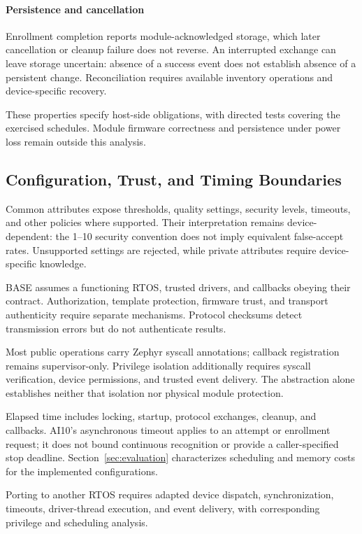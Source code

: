 \paragraph{Persistence and cancellation}
Enrollment completion reports module-acknowledged storage, which later cancellation or cleanup failure does not reverse. An interrupted exchange can leave storage uncertain: absence of a success event does not establish absence of a persistent change. Reconciliation requires available inventory operations and device-specific recovery.

These properties specify host-side obligations, with directed tests covering the exercised schedules. Module firmware correctness and persistence under power loss remain outside this analysis.

\subsection{Configuration, Trust, and Timing Boundaries}
\label{sec:threat_model}

Common attributes expose thresholds, quality settings, security levels, timeouts, and other policies where supported. Their interpretation remains device-dependent: the 1--10 security convention does not imply equivalent false-accept rates. Unsupported settings are rejected, while private attributes require device-specific knowledge.

BASE assumes a functioning RTOS, trusted drivers, and callbacks obeying their contract. Authorization, template protection, firmware trust, and transport authenticity require separate mechanisms. Protocol checksums detect transmission errors but do not authenticate results.

Most public operations carry Zephyr syscall annotations; callback registration remains supervisor-only. Privilege isolation additionally requires syscall verification, device permissions, and trusted event delivery. The abstraction alone establishes neither that isolation nor physical module protection.

Elapsed time includes locking, startup, protocol exchanges, cleanup, and callbacks. AI10's asynchronous timeout applies to an attempt or enrollment request; it does not bound continuous recognition or provide a caller-specified stop deadline. Section~\ref{sec:evaluation} characterizes scheduling and memory costs for the implemented configurations.

Porting to another RTOS requires adapted device dispatch, synchronization, timeouts, driver-thread execution, and event delivery, with corresponding privilege and scheduling analysis.